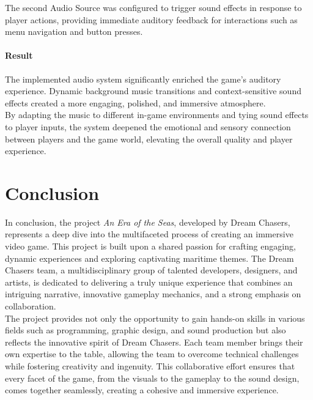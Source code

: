 \documentclass{article}
\begin{document}
The second Audio Source was configured to trigger sound effects in response to player actions, providing immediate auditory feedback for interactions such as menu navigation and button presses.

\paragraph{Result}\hfill

The implemented audio system significantly enriched the game's auditory experience. Dynamic background music transitions and context-sensitive sound effects created a more engaging, polished, and immersive atmosphere.\\

By adapting the music to different in-game environments and tying sound effects to player inputs, the system deepened the emotional and sensory connection between players and the game world, elevating the overall quality and player experience.











\newpage
\section{Conclusion}\hfill

In conclusion, the project \textit{An Era of the Seas}, developed by Dream Chasers, represents a deep dive into the multifaceted process of creating an immersive video game. This project is built upon a shared passion for crafting engaging, dynamic experiences and exploring captivating maritime themes. The Dream Chasers team, a multidisciplinary group of talented developers, designers, and artists, is dedicated to delivering a truly unique experience that combines an intriguing narrative, innovative gameplay mechanics, and a strong emphasis on collaboration.\\

The project provides not only the opportunity to gain hands-on skills in various fields such as programming, graphic design, and sound production but also reflects the innovative spirit of Dream Chasers. Each team member brings their own expertise to the table, allowing the team to overcome technical challenges while fostering creativity and ingenuity. This collaborative effort ensures that every facet of the game, from the visuals to the gameplay to the sound design, comes together seamlessly, creating a cohesive and immersive experience.\\
\end{document}
